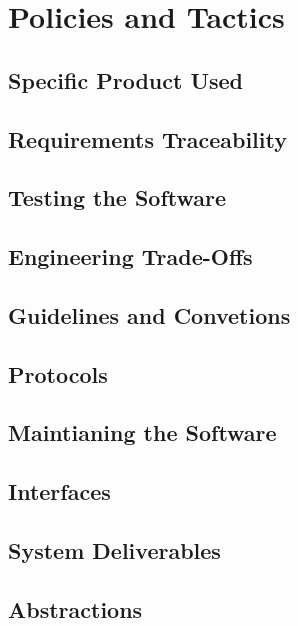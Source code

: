 \section{Policies and Tactics}
\label{sec:policies}

\subsection{Specific Product Used}
\label{sec:specific}

\subsection{Requirements Traceability}
\label{sec:traceability}

\subsection{Testing the Software}
\label{sec:testing}

\subsection{Engineering Trade-Offs}
\label{sec:tradeoffs}

\subsection{Guidelines and Convetions}
\label{sec:guidelines}

\subsection{Protocols}
\label{sec:protocols}

\subsection{Maintianing the Software}
\label{sec:maintain}

\subsection{Interfaces}
\label{sec:interfaces}

\subsection{System Deliverables}
\label{sec:deliverables}

\subsection{Abstractions}
\label{sec:abstractions}

